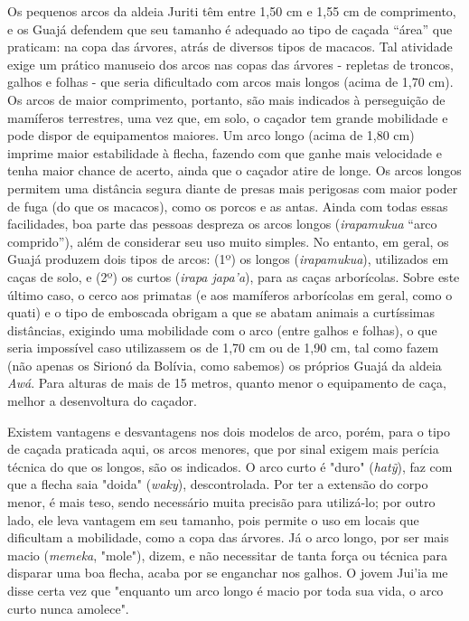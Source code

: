 Os pequenos arcos da aldeia Juriti têm entre 1,50 cm e 1,55 cm de
comprimento, e os Guajá defendem que seu tamanho é adequado ao tipo de
caçada ``área'' que praticam: na copa das árvores, atrás de diversos
tipos de macacos. Tal atividade exige um prático manuseio dos arcos nas
copas das árvores - repletas de troncos, galhos e folhas - que seria
dificultado com arcos mais longos (acima de 1,70 cm). Os arcos de maior
comprimento, portanto, são mais indicados à perseguição de mamíferos
terrestres, uma vez que, em solo, o caçador tem grande mobilidade e pode
dispor de equipamentos maiores. Um arco longo (acima de 1,80 cm) imprime
maior estabilidade à flecha, fazendo com que ganhe mais velocidade e
tenha maior chance de acerto, ainda que o caçador atire de longe. Os
arcos longos permitem uma distância segura diante de presas mais
perigosas com maior poder de fuga (do que os macacos), como os porcos e
as antas. Ainda com todas essas facilidades, boa parte das pessoas
despreza os arcos longos (\emph{irapamukua} ``arco comprido''), além de
considerar seu uso muito simples. No entanto, em geral, os Guajá
produzem dois tipos de arcos: (1º) os longos (\emph{irapamukua}),
utilizados em caças de solo, e (2º) os curtos (\emph{irapa japa'a}),
para as caças arborícolas. Sobre este último caso, o cerco aos primatas
(e aos mamíferos arborícolas em geral, como o quati) e o tipo de
emboscada obrigam a que se abatam animais a curtíssimas distâncias,
exigindo uma mobilidade com o arco (entre galhos e folhas), o que seria
impossível caso utilizassem os de 1,70 cm ou de 1,90 cm, tal como fazem
(não apenas os Sirionó da Bolívia, como sabemos) os próprios Guajá da
aldeia \emph{Awá}. Para alturas de mais de 15 metros, quanto menor o
equipamento de caça, melhor a desenvoltura do caçador.

Existem vantagens e desvantagens nos dois modelos de arco, porém, para o
tipo de caçada praticada aqui, os arcos menores, que por sinal exigem
mais perícia técnica do que os longos, são os indicados. O arco curto é
"duro" (\emph{hatỹ}), faz com que a flecha saia "doida" (\emph{waky}),
descontrolada. Por ter a extensão do corpo menor, é mais teso, sendo
necessário muita precisão para utilizá-lo; por outro lado, ele leva
vantagem em seu tamanho, pois permite o uso em locais que dificultam a
mobilidade, como a copa das árvores. Já o arco longo, por ser mais macio
(\emph{memeka}, "mole"), dizem, e não necessitar de tanta força ou
técnica para disparar uma boa flecha, acaba por se enganchar nos galhos.
O jovem Jui'ia me disse certa vez que "enquanto um arco longo é macio
por toda sua vida, o arco curto nunca amolece".

